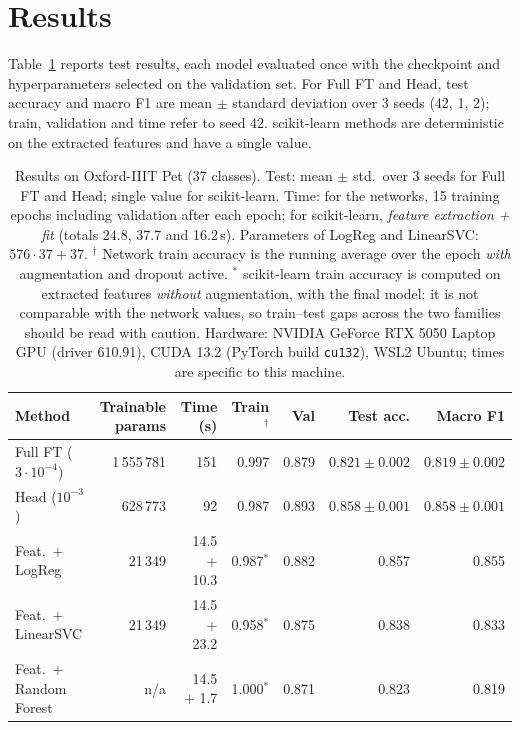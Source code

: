 \documentclass[11pt,a4paper]{article}
\newcommand{\gpuinfo}{NVIDIA GeForce RTX 5050 Laptop GPU (driver 610.91)}
\begin{document}
\section{Results}

Table~\ref{tab:results} reports test results, each model evaluated once with the checkpoint
and hyperparameters selected on the validation set. For Full FT and Head, test accuracy and
macro F1 are mean $\pm$ standard deviation over 3 seeds (42, 1, 2); train, validation and
time refer to seed 42. scikit-learn methods are deterministic on the extracted features and
have a single value.

\begin{table}[H]
\centering
\small
\setlength{\tabcolsep}{4pt}
\begin{tabular}{lrrrrrr}
\toprule
Method & Trainable params & Time (s) & Train$^{\dagger}$ & Val & Test acc. & Macro F1 \\
\midrule
Full FT ($3\!\cdot\!10^{-4}$) & 1\,555\,781 & 151 & 0.997 & 0.879 & $0.821\pm0.002$ & $0.819\pm0.002$ \\
Head ($10^{-3}$)              &   628\,773 &  92 & 0.987 & 0.893 & $0.858\pm0.001$ & $0.858\pm0.001$ \\
\midrule
Feat.\ + LogReg               &    21\,349 & 14.5 + 10.3 & 0.987$^{*}$ & 0.882 & 0.857 & 0.855 \\
Feat.\ + LinearSVC            &    21\,349 & 14.5 + 23.2 & 0.958$^{*}$ & 0.875 & 0.838 & 0.833 \\
Feat.\ + Random Forest        & n/a        & 14.5 + 1.7  & 1.000$^{*}$ & 0.871 & 0.823 & 0.819 \\
\bottomrule
\end{tabular}
\caption{Results on Oxford-IIIT Pet (37 classes). Test: mean $\pm$ std.\ over 3 seeds for Full
FT and Head; single value for scikit-learn. Time: for the networks, 15 training epochs including
validation after each epoch; for scikit-learn, \emph{feature extraction + fit}
(totals 24.8, 37.7 and 16.2\,s). Parameters of LogReg and LinearSVC: $576\cdot37+37$.
$^{\dagger}$ Network train accuracy is the running average over the epoch \emph{with}
augmentation and dropout active. $^{*}$ scikit-learn train accuracy is computed on extracted
features \emph{without} augmentation, with the final model: it is not comparable with the
network values, so train--test gaps across the two families should be read with caution.
Hardware: \gpuinfo, CUDA 13.2 (PyTorch build \texttt{cu132}), WSL2 Ubuntu; times are specific
to this machine.}
\label{tab:results}
\end{table}
\end{document}
